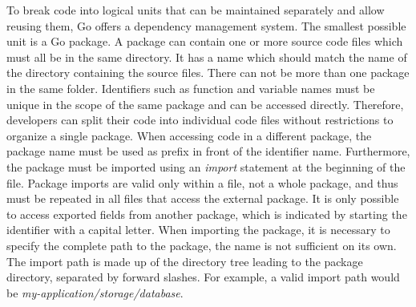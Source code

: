 To break code into logical units that can be maintained separately and allow reusing them, Go offers a dependency
management system.
The smallest possible unit is a Go package.
A package can contain one or more source code files which must all be in the same directory.
It has a name which should match the name of the directory containing the source files.
There can not be more than one package in the same folder.
Identifiers such as function and variable names must be unique in the scope of the same package and can be accessed
directly.
Therefore, developers can split their code into individual code files without restrictions to organize a single package.
When accessing code in a different package, the package name must be used as prefix in front of the identifier name.
Furthermore, the package must be imported using an \textit{import} statement at the beginning of the file.
Package imports are valid only within a file, not a whole package, and thus must be repeated in all files that access
the external package.
It is only possible to access exported fields from another package, which is indicated by starting the identifier with
a capital letter.
When importing the package, it is necessary to specify the complete path to the package, the name is not sufficient on
its own.
The import path is made up of the directory tree leading to the package directory, separated by forward slashes.
For example, a valid import path would be \textit{my-application/storage/database}.

